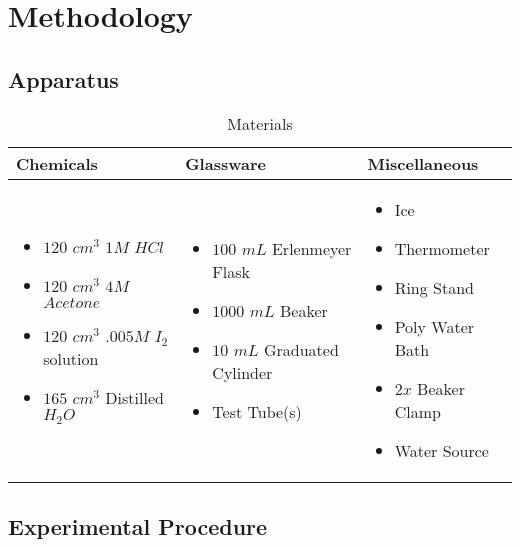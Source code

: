 \section{Methodology}

\subsection{Apparatus}

\begin{table}[h!]
\centering

\begin{tabular}{m{5cm} m{5cm} m{4cm}} 
 \toprule
 Chemicals & Glassware & Miscellaneous \\
 \midrule
	\begin{itemize}[]
	  \item $120$ $cm^3$ $1 M$ $HCl$
	  \item $120$ $cm^3$ $4 M$ $Acetone$
	  \item $120$ $cm^3$ $.005 M$ $I_2$ solution 
	  \item $165$ $cm^3$ Distilled $H_2O$
	\end{itemize} & 
	\begin{itemize}[]
	  \item $100$ $mL$ Erlenmeyer Flask
	  \item $1000$ $mL$ Beaker
	  \item $10$ $mL$ Graduated Cylinder
	  \item Test Tube(s)
	\end{itemize} & 
	\begin{itemize}[]
	  \item Ice
	  \item Thermometer
	  \item Ring Stand
	  \item Poly Water Bath
	  \item $2x$ Beaker Clamp
	  \item Water Source
	\end{itemize} \\
  \bottomrule
\end{tabular}
\caption{Materials}
\label{table:apparatus}
\end{table}

\subsection{Experimental Procedure}
